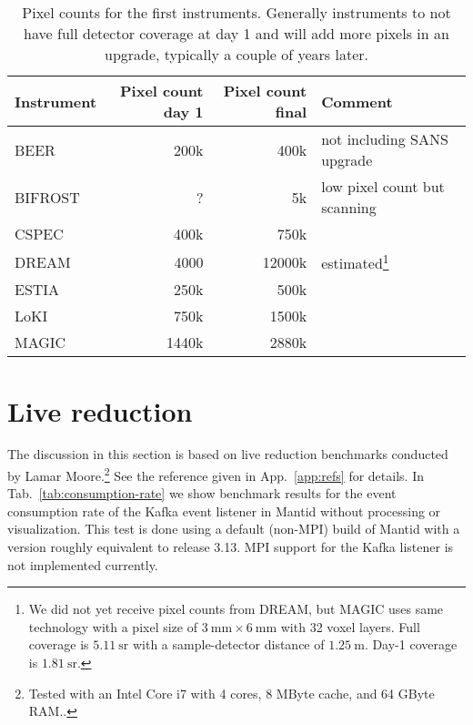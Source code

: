 \documentclass[a4paper,english,numbers=noenddot,bibliography=totoc,chapterprefix=on,DIV=12]{scrartcl}
\newcommand{\beer}{BEER\xspace}
\newcommand{\bifrost}{BIFROST\xspace}
\newcommand{\cspec}{CSPEC\xspace}
\newcommand{\dream}{DREAM\xspace}
\newcommand{\estia}{ESTIA\xspace}
\newcommand{\loki}{LoKI\xspace}
\newcommand{\magic}{MAGIC\xspace}
\newcommand{\mantid}{Mantid\xspace}
\begin{document}
\begin{table}
  \centering
  \begin{tabular}{lrrl}
    Instrument & Pixel count day 1 & Pixel count final & Comment\\
    \hline
    \beer & 200k & 400k & not including SANS upgrade\\
    \bifrost & ? & 5k & low pixel count but scanning\\
    \cspec & 400k & 750k \\
    \dream & 4000 & 12000k & estimated\footnote{We did not yet receive pixel counts from DREAM, but MAGIC uses same technology with a pixel size of $3~\mathrm{mm} \times 6~\mathrm{mm}$ with 32 voxel layers. Full coverage is $5.11~\mathrm{sr}$ with a sample-detector distance of $1.25~\mathrm{m}$. Day-1 coverage is $1.81~\mathrm{sr}$.}\\
    \estia & 250k & 500k \\
    \loki & 750k & 1500k \\
    \magic & 1440k & 2880k \\
  \end{tabular}
  \caption{\label{tab:pixel-counts}Pixel counts for the first instruments. Generally instruments to not have full detector coverage at day 1 and will add more pixels in an upgrade, typically a couple of years later.}
\end{table}




\section{Live reduction}

The discussion in this section is based on live reduction benchmarks conducted by Lamar Moore.\footnote{Tested with an Intel Core i7 with 4 cores, 8 MByte cache, and 64 GByte RAM..}
See the reference given in App.~\ref{app:refs} for details.
In Tab.~\ref{tab:consumption-rate} we show benchmark results for the event consumption rate of the Kafka event listener in \mantid without processing or visualization.
This test is done using a default (non-MPI) build of \mantid with a version roughly equivalent to release 3.13.
MPI support for the Kafka listener is not implemented currently.
\end{document}
